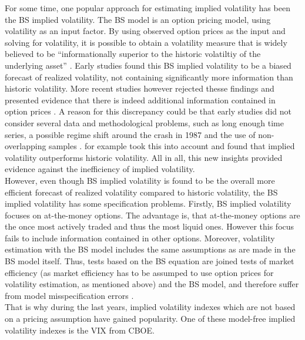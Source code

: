 For some time, one popular approach for estimating implied volatility has been the \ac{BS} implied volatility. The \ac{BS} model is an option pricing model, using volatility as an input factor. By using observed option prices as the input and solving for volatility, it is possible to obtain a volatility measure that is widely believed to be ``informationally superior to the historic volatiltiy of the underlying asset'' \parencite[p.1305]{jiang2003}. Early studies found this \ac{BS} implied volatility to be a biased forecast of realized volatility, not containing significantly more information than historic volatility. More recent studies however rejected thesse findings and presented evidence that there is indeed additional information contained in option prices \parencite{jiang2003}. A reason for this discrepancy could be that early studies did not consider several data and methodological problems, such as long enough time series, a possible regime shift around the crash in 1987 and the use of non-overlapping samples \parencite{jiang2003}. \citeauthor{christensen1998} for example took this into account and found that implied volatility outperforms historic volatility. All in all, this new insights provided evidence against the inefficiency of implied volatility.\\
However, even though \ac{BS} implied volatility is found to be the overall more efficient forecast of realized volatility compared to historic volatility, the \ac{BS} implied volatility has some specification problems. Firstly, \ac{BS} implied volatility focuses on at-the-money options. The advantage is, that at-the-money options are the once most actively traded and thus the most liquid ones. However this focus fails to include information contained in other options. Moreover, volatility estimation with the \ac{BS} model includes the same assumptions as are made in the \ac{BS} model itself. Thus, tests based on the \ac{BS} equation are joined tests of market efficiency (as market efficiency has to be assumped to use option prices for volatility estimation, as mentioned above) and the \ac{BS} model, and therefore suffer from model misspecification errors \parencite{jiang2003}. \\
That is why during the last years, implied volatility indexes which are not based on a pricing assumption have gained popularity. One of these model-free implied volatility indexes is the \ac{VIX} from \ac{CBOE}.





